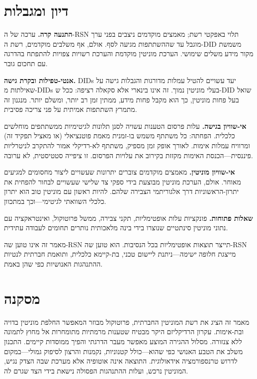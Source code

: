 \documentclass[11pt,a4paper,twocolumn]{article}
\begin{document}
\section{דיון ומגבלות}

\textbf{התנעה קרה.} ערכה של ה-RSN תלוי באפקטי רשת; מאמצים מוקדמים ניצבים בפני ערך מוגבל עד שההשתתפות מגיעה לסף. אולם, אף משלבים מוקדמים, רשת ה-DID משמשת מקור מידע משלים שימושי. הערכת מוניטין מוקדמת והערכת רשויות צפויות להתפתח בהדרגה עם תחכום גובר.

\textbf{אנטי-טפילות ובקרת גישה.} DIDs יעד עשויים להטיל עמלות מדורגות והגבלות גישה על שאילתות מ-DIDs בעלי מוניטין נמוך. זה אינו בינארי אלא סקאלה רציפה: ככל ש-DID שואל בעל פחות מוניטין, כך הוא מקבל פחות מידע, ממתין זמן רב יותר, ומשלם יותר. מנגנון זה מתמרץ השתתפות אמיתית על פני צריכה פסיבית.

\textbf{אי-שוויון בגישה.} עלות פרסום הטענות עשויה לסנן תלונות לגיטימיות ממשתתפים מוחלשים כלכלית. הפחתה: כל משתתף משמש בו-זמנית מאמת פוטנציאלי (או מאציל תפקיד זה) ומרוויח עמלות אימות. לאורך אופק זמן מספיק, משתתף לא-רדיקלי אמור להתקרב לניטרליות פיננסית---הכנסת האימות מקזזת בקירוב את עלויות הפרסום. זו ציפייה סטטיסטית, לא ערובה.

\textbf{אי-שוויון מוניטין.} מאמצים מוקדמים צוברים יתרונות שעשויים ליצור מחסומים למגיעים מאוחר. אולם, הערכת מוניטין מבוצעת בידי ספקי צד שלישי שעשויים לבחור להפחית את יתרון-הראשוניות דרך אלגוריתמי הצבירה שלהם. להיות ראשון עם מוניטין טוב הוא יתרון כלכלי השוואתי לגיטימי---וכך במתכוון.

\textbf{שאלות פתוחות.} פונקציות עלות אופטימליות, תקני צבירה, ממשל פרוטוקול, ואינטראקציה עם נתוני מוניטין סינתטיים שנוצרו בידי בינה מלאכותית נותרים תחומים לעבודה עתידית.

מאמר זה אינו טוען שה-RSN תייצר תוצאות אופטימליות בכל הנסיבות. הוא טוען שה-RSN מייצגת חלופה \emph{ישימה}---ניתנת ליישום טכני, בת-קיימא כלכלית, ותואמת חברתית לנטיות ההתנהגות האנושיות כפי שהן באמת.

\section{מסקנה}

מאמר זה הציג את רשת המוניטין החברתית, פרוטוקול מבוזר המאפשר החלפת מוניטין בדויה ובת-אימות. עקרון הרדיקליזם היקר מבטיח שטענות מרמתיות מתומחרות אל מחוץ לתמונה ללא צנזורה. מסלול ההגירה המוצע מאפשר מעבר הדרגתי והפיך ממוסדות קיימים. התכנון משלב את הטבע האנושי כפי שהוא---כולל קטנוניות, נקמנות והרצון לסיפוק גמולי---במקום לדרוש טרנספורמציה אידאולוגית. התוצאה אינה אוטופיה אלא מערכת שבה הצדק נגיש, המוניטין נרכש, ועלות ההתנהגות הפסולה נישאת בידי הצד שגרם לה.


\end{document}
